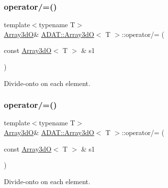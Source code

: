 \subsubsection{\texorpdfstring{operator/=()}{operator/=()}\hspace{0.1cm}{\footnotesize\ttfamily [2/6]}}
{\footnotesize\ttfamily template$<$typename T$>$ \\
\mbox{\hyperlink{classADAT_1_1Array3dO}{Array3dO}}\& \mbox{\hyperlink{classADAT_1_1Array3dO}{A\+D\+A\+T\+::\+Array3dO}}$<$ T $>$\+::operator/= (\begin{DoxyParamCaption}\item[{const \mbox{\hyperlink{classADAT_1_1Array3dO}{Array3dO}}$<$ T $>$ \&}]{s1 }\end{DoxyParamCaption})\hspace{0.3cm}{\ttfamily [inline]}}



Divide-\/onto on each element. 

\mbox{\label{classADAT_1_1Array3dO_a634dcf5154efc0a7496d50f4f258978d}} 
\subsubsection{\texorpdfstring{operator/=()}{operator/=()}\hspace{0.1cm}{\footnotesize\ttfamily [3/6]}}
{\footnotesize\ttfamily template$<$typename T$>$ \\
\mbox{\hyperlink{classADAT_1_1Array3dO}{Array3dO}}\& \mbox{\hyperlink{classADAT_1_1Array3dO}{A\+D\+A\+T\+::\+Array3dO}}$<$ T $>$\+::operator/= (\begin{DoxyParamCaption}\item[{const \mbox{\hyperlink{classADAT_1_1Array3dO}{Array3dO}}$<$ T $>$ \&}]{s1 }\end{DoxyParamCaption})\hspace{0.3cm}{\ttfamily [inline]}}



Divide-\/onto on each element. 

\mbox{\label{classADAT_1_1Array3dO_a9d82ba391c67603f43b112c945532de6}} 
